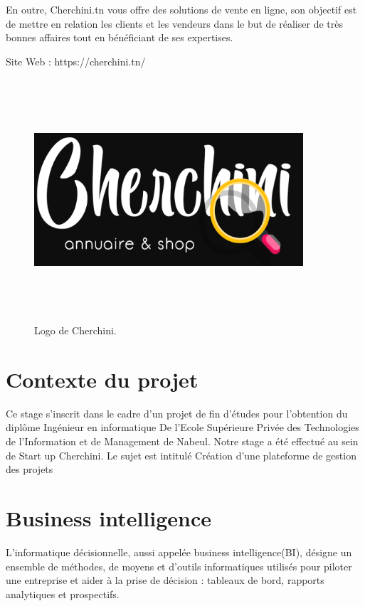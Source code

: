 \bigskip
 En outre, Cherchini.tn vous offre des solutions de vente en ligne, son objectif
est de mettre en relation les clients et les vendeurs dans le but de r\'{e}aliser de
tr\`{e}s bonnes affaires tout en b\'{e}n\'{e}ficiant de ses expertises.

Site Web : https://cherchini.tn/

\bigskip

  \FloatBarrier
\begin{figure}[H]
\center
\includegraphics[width=10cm,height=9cm]{./figures/cherchini-logo.png}
\caption{Logo de Cherchini.}

\end{figure}
  \FloatBarrier

\section{Contexte du projet }
Ce stage s'inscrit dans le cadre d'un projet de fin d'\'{e}tudes pour l'obtention du
dipl\^{o}me Ing\'{e}nieur en informatique De l'Ecole Sup\'{e}rieure Priv\'{e}e des
Technologies de l'Information et de Management de Nabeul.
Notre stage a \'{e}t\'{e} effectu\'{e} au sein de Start up Cherchini.
Le sujet est intitul\'{e} \guillemotleft{}Cr\'{e}ation d'une plateforme de gestion des projets\guillemotright{}

\section{Business intelligence}
 L'informatique d\'{e}cisionnelle, aussi appel\'{e}e business intelligence(BI), d\'{e}signe un ensemble de m\'{e}thodes, de moyens et d'outils informatiques utilis\'{e}s pour piloter une entreprise et aider \`{a} la prise de d\'{e}cision : tableaux de bord, rapports analytiques et prospectifs.

